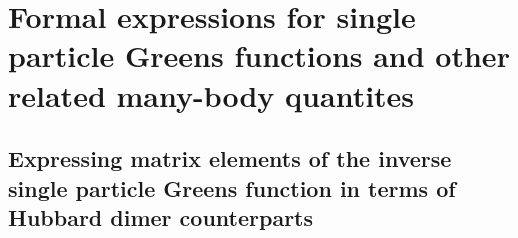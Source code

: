 \documentclass[12pt]{article}
\numberwithin{equation}{section}
\begin{document}
\section{Formal expressions for single particle Greens functions and other related many-body quantites}
\subsection{Expressing matrix elements of the inverse single particle Greens function in terms of Hubbard dimer counterparts}
\end{document}

